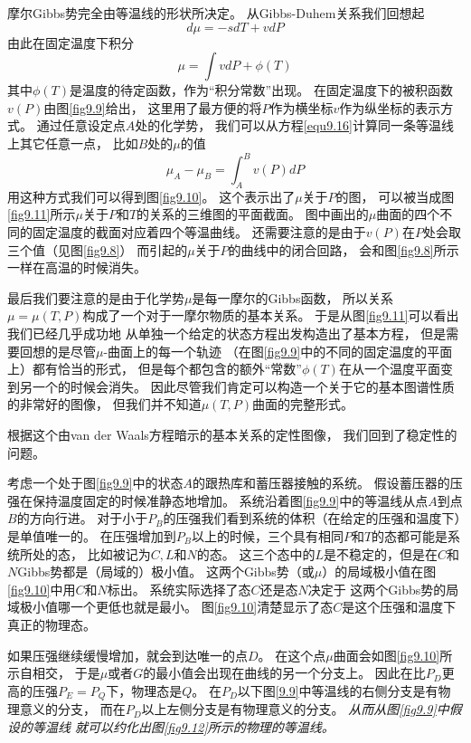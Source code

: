 摩尔Gibbs势完全由等温线的形状所决定。
从Gibbs-Duhem关系我们回想起
\begin{equation}
\label{equ9.15}
d\mu=-sdT+vdP
\end{equation}
由此在固定温度下积分
\begin{equation}
\label{equ9.16}
\mu=\int vdP+\phi(T)
\end{equation}
其中$\phi(T)$是温度的待定函数，作为“积分常数”出现。
在固定温度下的被积函数$v(P)$由图\ref{fig9.9}给出，
这里用了最方便的将$P$作为横坐标$v$作为纵坐标的表示方式。
通过任意设定点$A$处的化学势，
我们可以从方程\ref{equ9.16}计算同一条等温线上其它任意一点，
比如$B$处的$\mu$的值
\begin{equation}
\label{equ9.17}
\mu_A-\mu_B=\int_A^Bv(P)dP
\end{equation}
用这种方式我们可以得到图\ref{fig9.10}。
这个表示出了$\mu$关于$P$的图，
可以被当成图\ref{fig9.11}所示$\mu$关于$P$和$T$的关系的三维图的平面截面。
图中画出的$\mu$曲面的四个不同的固定温度的截面对应着四个等温曲线。
还需要注意的是由于$v(P)$在$P$处会取三个值（见图\ref{fig9.8}）
而引起的$\mu$关于$P$的曲线中的闭合回路，
会和图\ref{fig9.8}所示一样在高温的时候消失。

最后我们要注意的是由于化学势$\mu$是每一摩尔的Gibbs函数，
所以关系$\mu=\mu(T,P)$构成了一个对于一摩尔物质的基本关系。
于是从图\ref{fig9.11}可以看出我们已经几乎成功地
从单独一个给定的状态方程出发构造出了基本方程，
但是需要回想的是尽管$\mu$-曲面上的每一个轨迹
（在图\ref{fig9.9}中的不同的固定温度的平面上）都有恰当的形式，
但是每个都包含的额外“常数”$\phi(T)$在从一个温度平面变到另一个的时候会消失。
因此尽管我们肯定可以构造一个关于它的基本图谱性质的非常好的图像，
但我们并不知道$\mu(T,P)$曲面的完整形式。

根据这个由van der Waals方程暗示的基本关系的定性图像，
我们回到了稳定性的问题。

考虑一个处于图\ref{fig9.9}中的状态$A$的跟热库和蓄压器接触的系统。
假设蓄压器的压强在保持温度固定的时候准静态地增加。
系统沿着图\ref{fig9.9}中的等温线从点$A$到点$B$的方向行进。
对于小于$P_B$的压强我们看到系统的体积（在给定的压强和温度下）是单值唯一的。
在压强增加到$P_B$以上的时候，三个具有相同$P$和$T$的态都可能是系统所处的态，
比如被记为$C,L$和$N$的态。
这三个态中的$L$是不稳定的，但是在$C$和$N$Gibbs势都是（局域的）极小值。
这两个Gibbs势（或$\mu$）的局域极小值在图\ref{fig9.10}中用$C$和$N$标出。
系统实际选择了态$C$还是态$N$决定于
这两个Gibbs势的局域极小值哪一个更低也就是最小。
图\ref{fig9.10}清楚显示了态$C$是这个压强和温度下真正的物理态。

如果压强继续缓慢增加，就会到达唯一的点$D$。
在这个点$\mu$曲面会如图\ref{fig9.10}所示自相交，
于是$\mu$或者$G$的最小值会出现在曲线的另一个分支上。
因此在比$P_D$更高的压强$P_E=P_Q$下，物理态是$Q$。
在$P_D$以下图\ref{9.9}中等温线的右侧分支是有物理意义的分支，
而在$P_D$以上左侧分支是有物理意义的分支。
{\it 从而从图\ref{fig9.9}中假设的等温线
就可以约化出图\ref{fig9.12}所示的物理的等温线。}


